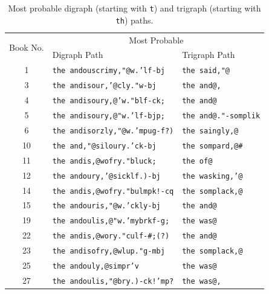 \documentclass[conference]{IEEEtran}
\newcommand{\codeinline}[1]{{\fontsize{8}{0}\selectfont\texttt{#1}}}
\newcommand{\codeintable}[1]{{\fontsize{6.215}{7.458}\selectfont\texttt{#1}}}
\begin{document}
\begin{table}[htb]
\caption{\hspace{2em}Most probable digraph (starting with \codeinline{t}) and \newline 
trigraph (starting with \codeinline{th}) paths.\label{tab:problem1f}}
\vspace{-10pt}
\begin{center}
\begin{tabular}{cll}
\hline 
\multirow{2}{*}{Book No.} & \multicolumn{2}{c}{Most Probable}  \\
\cline{2-3}
 & Digraph Path & Trigraph Path \\
\hline
1  & \codeintable{the andouscrimy,"@w.'lf-bj} & \codeintable{the said,"@} \\
3  & \codeintable{the andisour,'@cly."w-bj} & \codeintable{the and@,} \\
4  & \codeintable{the andisoury,@'w."blf-ck;} & \codeintable{the and@} \\
5  & \codeintable{the andisoury,@"w.'lf-bjp;} & \codeintable{the and@."-somplik} \\
6  & \codeintable{the andisorzly,"@w.'mpug-f?)} & \codeintable{the saingly,@} \\
10 & \codeintable{the and,"@siloury.'ck-bj} & \codeintable{the sompard,@\#} \\
11 & \codeintable{the andis,@wofry."bluck;} & \codeintable{the of@} \\
12 & \codeintable{the andoury,'@sicklf.)-bj} & \codeintable{the wasking,'@} \\
14 & \codeintable{the andis,@wofry."bulmpk!-cq} & \codeintable{the somplack,@} \\
15 & \codeintable{the andouris,"@w.'ckly-bj} & \codeintable{the and@} \\
19 & \codeintable{the andoulis,@"w.'mybrkf-g;} & \codeintable{the was@} \\
22 & \codeintable{the andis,@wory."culf-\#;(?)} & \codeintable{the and@} \\
23 & \codeintable{the andisofry,@wlup."g-mbj} & \codeintable{the somplack,@} \\
25 & \codeintable{the andouly,@simpr'v} & \codeintable{the was@} \\
27 & \codeintable{the andoulis,"@bry.)-ck!'mp?} & \codeintable{the was@,} \\
\hline
\end{tabular}
\end{center}
\end{table}
\end{document}
